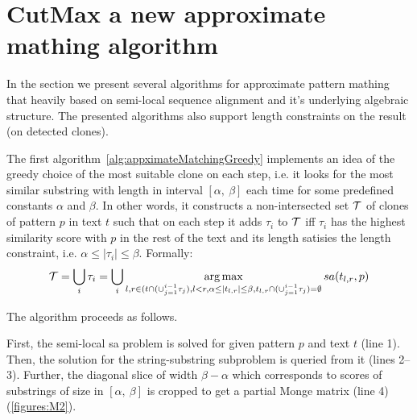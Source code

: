 \section{CutMax a new approximate mathing algorithm}
\label{section:our}

In the section we present several algorithms for approximate pattern mathing that heavily based on semi-local sequence alignment and it's underlying algebraic structure.
The presented algorithms also support length constraints on the result (on detected clones).

The first algorithm~\ref{alg:appximateMatchingGreedy} implements an idea of the greedy choice of the most suitable clone on each step, i.e. it looks for the most similar substring with length in interval $[\alpha,\ \beta]$ each time for some predefined constants $\alpha$ and $\beta$.
In other words, it constructs a non-intersected set ${\mathcal{T}}$ of clones of pattern $p$ in text $t$ such that on each step it adds $\tau_i$ to ${\mathcal{T}}$ iff $\tau_i$ has the highest similarity score with $p$ in the rest of the text and its length satisies the length constraint, i.e. $\alpha \leq |\tau_i| \leq \beta$.
Formally:
\begin{equation}
   {\mathcal{T}} = \bigcup_{i} \tau_i = \bigcup_i \operatorname*{arg\,max}_{l,r \in (t \cap (\cup_{j=1}^{i-1} \tau_{j}),l<r, \alpha \leq |t_{l,r}| \leq \beta ,t_{l,r} \cap (\cup_{j=1}^{i-1} \tau_{j}) = \emptyset } sa(t_{l,r}, p)
\end{equation}

The algorithm proceeds as follows.

First, the semi-local sa problem is solved for given pattern $p$ and text $t$ (line 1).
Then, the solution for the string-substring subproblem is queried from it (lines 2--3).
Further, the diagonal slice of width $\beta-\alpha$ which corresponds to scores of substrings of size in $[\alpha,\ \beta]$ is cropped to get a partial Monge matrix (line 4) (\ref{figures:M2}).



